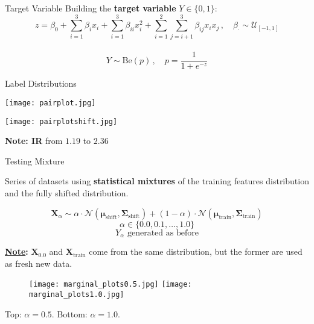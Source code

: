 \begin{frame}{Target Variable}
    Building the \textbf{target variable} $Y\in\{0,1\}$:
        $$ 
        z = \beta_0 + \sum_{i=1}^3 \beta_i x_i + \sum_{i=1}^3 \beta_{ii} x_i^2 + \sum_{i=1}^{2} \sum_{j=i+1}^3 \beta_{ij} x_i x_j\,,   \quad \beta_{\cdot} \sim \mathcal{U}_{[-1,1]}
        $$\\
        $$ Y \sim \text{Be}(p)\,, \quad p = \frac{1}{1 + e^{-z}}$$

\end{frame}

\begin{frame}{Label Distributions} 
    \vfill
    \centering
    \begin{minipage}{0.45\textwidth}
        \centering
        \texttt{[image: pairplot.jpg]}
    \end{minipage}
    \hfill
    \begin{minipage}{0.45\textwidth}
        \centering
        \texttt{[image: pairplotshift.jpg]}
    \end{minipage}
    \vfill
    \textbf{Note: IR} from $1.19$ to $2.36$ 
    \vfill

\end{frame}


\begin{frame}{Testing Mixture}
    
    Series of datasets using \textbf{statistical mixtures} of the training features distribution and the fully shifted distribution.

    $$
    \boldsymbol{X}_\alpha \sim \alpha\cdot\mathcal{N}(\boldsymbol{\mu}_{\text{shift}}, \boldsymbol{\Sigma}_{\text{shift}}) + (1-\alpha)\cdot\mathcal{N}(\boldsymbol{\mu}_{\text{train}}, \boldsymbol{\Sigma}_{\text{train}})
    $$
    $$
    \alpha \in \{0.0, 0.1, \dots, 1.0\}
    $$
    $$
    Y_\alpha \text{ generated as before}
    $$

    \textbf{\underline{Note}:} $\boldsymbol{X}_{0.0}$ and $\boldsymbol{X}_{\text{train}}$ come from the same distribution, but the former are used as fresh new data.

\end{frame}

\begin{frame}
    \vfill
    \begin{figure}
        \centering
        \texttt{[image: marginal\_plots0.5.jpg]}
        \texttt{[image: marginal\_plots1.0.jpg]}
    \end{figure}
    Top: $\alpha=0.5$. Bottom: $\alpha=1.0$.
\end{frame}

